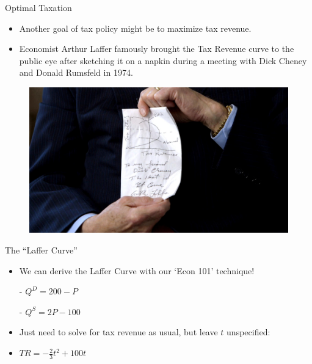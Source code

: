 \documentclass[9pt, handout]{beamer}
\begin{document}
\begin{frame}{Optimal Taxation}
    \begin{itemize}
        \item Another goal of tax policy might be to maximize tax revenue.
        \item Economist Arthur Laffer famously brought the Tax Revenue curve to the public eye after sketching it on a napkin during a meeting with Dick Cheney and Donald Rumsfeld in 1974.
    \end{itemize}
    \begin{figure}
        \centering
        \includegraphics[width=.85\linewidth]{laffer curve.jpg}
    \end{figure}
\end{frame}

\begin{frame}{The ``Laffer Curve''}
    \begin{itemize}
        \item We can derive the Laffer Curve with our `Econ 101' technique!
    \end{itemize}
    \vspace{5pt}
    \begin{itemize}
        \item[-] $Q^D = 200-P$
        \item[-] $Q^S = 2P-100$
    \end{itemize}
    \vspace{10pt}
    \begin{itemize}
        \item Just need to solve for tax revenue as usual, but leave $t$ unspecified:
        \vspace{5pt}
        \item $TR = -\frac{2}{3}t^2 + 100 t$
    \end{itemize}
\end{frame}
\end{document}
